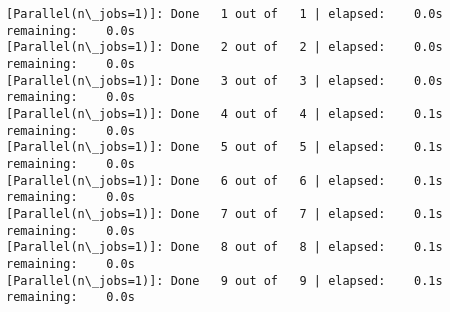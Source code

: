 \documentclass[11pt]{article}
\begin{document}
    \begin{Verbatim}[commandchars=\\\{\}]
[Parallel(n\_jobs=1)]: Done   1 out of   1 | elapsed:    0.0s remaining:    0.0s
[Parallel(n\_jobs=1)]: Done   2 out of   2 | elapsed:    0.0s remaining:    0.0s
[Parallel(n\_jobs=1)]: Done   3 out of   3 | elapsed:    0.0s remaining:    0.0s
[Parallel(n\_jobs=1)]: Done   4 out of   4 | elapsed:    0.1s remaining:    0.0s
[Parallel(n\_jobs=1)]: Done   5 out of   5 | elapsed:    0.1s remaining:    0.0s
[Parallel(n\_jobs=1)]: Done   6 out of   6 | elapsed:    0.1s remaining:    0.0s
[Parallel(n\_jobs=1)]: Done   7 out of   7 | elapsed:    0.1s remaining:    0.0s
[Parallel(n\_jobs=1)]: Done   8 out of   8 | elapsed:    0.1s remaining:    0.0s
[Parallel(n\_jobs=1)]: Done   9 out of   9 | elapsed:    0.1s remaining:    0.0s

    \end{Verbatim}
\end{document}
